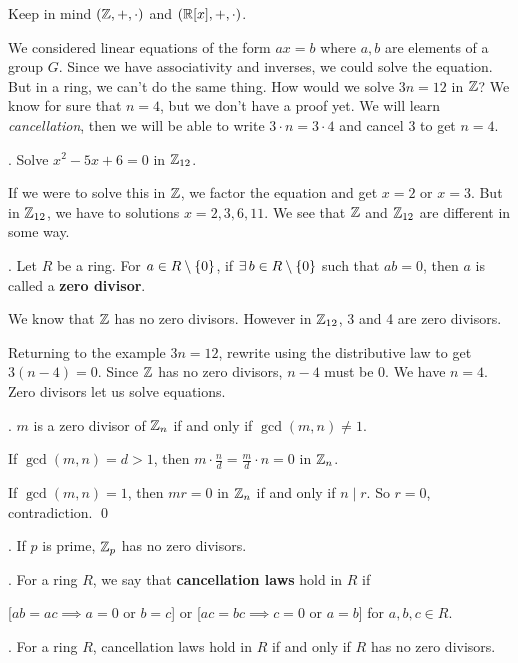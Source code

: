 
Keep in mind \((\mathbb{Z}, +, \cdot)\) and \((\mathbb{R}[x], +, \cdot)\).

We considered linear equations of the form \(ax=b\) where \(a, b\) are elements of a group \(G\). Since we have associativity and inverses, we could solve the equation. But in a ring, we can't do the same thing. How would we solve \(3n = 12\) in \(\mathbb{Z}\)? We know for sure that \(n = 4\), but we don't have a proof yet. We will learn \textit{cancellation}, then we will be able to write \(3 \cdot n = 3 \cdot 4\) and cancel 3 to get \(n = 4\).

\ex. Solve \(x^2 - 5x + 6 = 0\) in \(\mathbb{Z}_{12}\).

\rmk If we were to solve this in \(\mathbb{Z}\), we factor the equation and get \(x = 2\) or \(x = 3\). But in \(\mathbb{Z}_{12}\), we have to solutions \(x = 2, 3, 6, 11\). We see that \(\mathbb{Z}\) and \(\mathbb{Z}_{12}\) are different in some way.

.  Let \(R\) be a ring. For \(a \in R \setminus \{0\}\), if \(\exists b \in R \bs \{0\}\) such that \(ab = 0\), then \(a\) is called a \textbf{zero divisor}.

\rmk We know that \(\mathbb{Z}\) has no zero divisors. However in \(\mathbb{Z}_{12}\), 3 and 4 are zero divisors.

Returning to the example \(3n = 12\), rewrite using the distributive law to get \(3(n - 4) = 0\). Since \(\mathbb{Z}\) has no zero divisors, \(n - 4\) must be 0. We have \(n = 4\). Zero divisors let us solve equations.

\thm. \(m\) is a zero divisor of \(\mathbb{Z}_n\) if and only if \(\gcd(m, n) \neq 1\).

\pf \note{\mimpd} If \(\gcd(m, n) = d > 1\), then \(m \cdot \frac{n}{d} = \frac{m}{d}\cdot n = 0\) in \(\mathbb{Z}_n\).

\note{\mimp} If \(\gcd(m, n) = 1\), then \(mr = 0\) in \(\mathbb{Z}_n\) if and only if \(n \mid r\). So \(r = 0\), contradiction. \qed

\cor. If \(p\) is prime, \(\mathbb{Z}_p\) has no zero divisors.

\pagebreak

.  For a ring \(R\), we say that \textbf{cancellation laws} hold in \(R\) if
\begin{center}
    [\(ab = ac \implies a = 0\) or \(b = c\)] or [\(ac = bc \implies c = 0\) or \(a = b\)] for \(a, b, c \in R\).
\end{center}

\thm. For a ring \(R\), cancellation laws hold in \(R\) if and only if \(R\) has no zero divisors.

